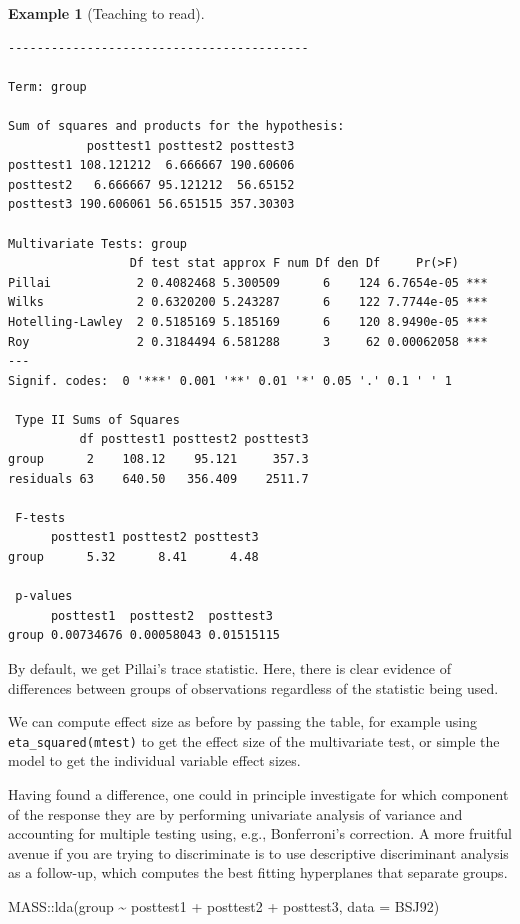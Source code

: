 \documentclass[
  11pt,
  letterpaper,
]{scrbook}
\newenvironment{Shaded}{\begin{snugshade}}{\end{snugshade}}
\newcommand{\AttributeTok}[1]{\textcolor[rgb]{0.40,0.45,0.13}{#1}}
\newcommand{\FunctionTok}[1]{\textcolor[rgb]{0.28,0.35,0.67}{#1}}
\newcommand{\NormalTok}[1]{\textcolor[rgb]{0.00,0.23,0.31}{#1}}
\newcommand{\SpecialCharTok}[1]{\textcolor[rgb]{0.37,0.37,0.37}{#1}}
\theoremstyle{definition}
\newtheorem{example}{Example}[chapter]
\theoremstyle{remark}
\begin{document}
\begin{example}[Teaching to
read]
\begin{verbatim}
------------------------------------------
 
Term: group 

Sum of squares and products for the hypothesis:
           posttest1 posttest2 posttest3
posttest1 108.121212  6.666667 190.60606
posttest2   6.666667 95.121212  56.65152
posttest3 190.606061 56.651515 357.30303

Multivariate Tests: group
                 Df test stat approx F num Df den Df     Pr(>F)    
Pillai            2 0.4082468 5.300509      6    124 6.7654e-05 ***
Wilks             2 0.6320200 5.243287      6    122 7.7744e-05 ***
Hotelling-Lawley  2 0.5185169 5.185169      6    120 8.9490e-05 ***
Roy               2 0.3184494 6.581288      3     62 0.00062058 ***
---
Signif. codes:  0 '***' 0.001 '**' 0.01 '*' 0.05 '.' 0.1 ' ' 1

 Type II Sums of Squares
          df posttest1 posttest2 posttest3
group      2    108.12    95.121     357.3
residuals 63    640.50   356.409    2511.7

 F-tests
      posttest1 posttest2 posttest3
group      5.32      8.41      4.48

 p-values
      posttest1  posttest2  posttest3 
group 0.00734676 0.00058043 0.01515115
\end{verbatim}

By default, we get Pillai's trace statistic. Here, there is clear
evidence of differences between groups of observations regardless of the
statistic being used.

We can compute effect size as before by passing the table, for example
using \texttt{eta\_squared(mtest)} to get the effect size of the
multivariate test, or simple the model to get the individual variable
effect sizes.

Having found a difference, one could in principle investigate for which
component of the response they are by performing univariate analysis of
variance and accounting for multiple testing using, e.g., Bonferroni's
correction. A more fruitful avenue if you are trying to discriminate is
to use descriptive discriminant analysis as a follow-up, which computes
the best fitting hyperplanes that separate groups.

\begin{Shaded}
\begin{Highlighting}[]
\NormalTok{MASS}\SpecialCharTok{::}\FunctionTok{lda}\NormalTok{(group }\SpecialCharTok{\textasciitilde{}}\NormalTok{ posttest1 }\SpecialCharTok{+}\NormalTok{ posttest2 }\SpecialCharTok{+}\NormalTok{ posttest3,}
          \AttributeTok{data =}\NormalTok{ BSJ92)}
\end{Highlighting}
\end{Shaded}


\end{example}
\end{document}
